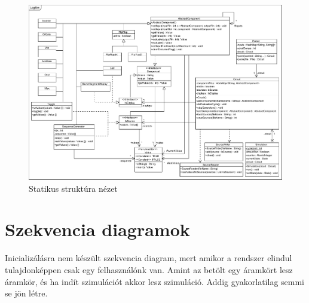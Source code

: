 \begin{figure}[H]
\begin{center}
\includegraphics[angle=90, width=17cm]{chapters/chapter03/classdiagram/class.pdf}
\caption{Statikus struktúra nézet}
\label{fig:class_diagram}
\end{center}
\end{figure}
%
%
%

\section{Szekvencia diagramok}
Inicializálásra nem készült szekvencia diagram, mert amikor a rendszer elindul tulajdonképpen csak egy felhasználónk van. Amint az betölt egy áramkört lesz áramkör, és ha indít szimulációt akkor lesz szimuláció. Addig gyakorlatilag semmi se jön létre.


